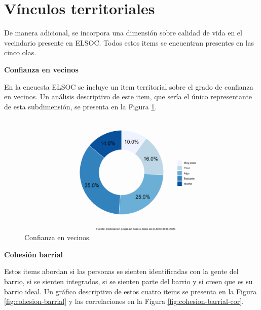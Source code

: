 \documentclass[
  12pt,
]{book}
\begin{document}
\hypertarget{vuxednculos-territoriales}{%
\section{Vínculos territoriales}\label{vuxednculos-territoriales}}

De manera adicional, se incorpora una dimensión sobre calidad de vida en el vecindario presente en ELSOC. Todos estos items se encuentran presentes en las cinco olas.

\textbf{Confianza en vecinos}

En la encuesta ELSOC se incluye un item territorial sobre el grado de confianza en vecinos. Un análisis descriptivo de este item, que sería el único representante de esta subdimensión, se presenta en la Figura \ref{fig:confianza-vecinos}.

\begin{figure}[H]

{\centering \includegraphics[width=1\linewidth,height=1\textheight]{output/graphs/confianza-vecinos} 

}

\caption{Confianza en vecinos.}\label{fig:confianza-vecinos}
\end{figure}

\textbf{Cohesión barrial}

Estos items abordan si las personas se sienten identificadas con la gente del barrio, si se sienten integrados, si se sienten parte del barrio y si creen que es su barrio ideal. Un gráfico descriptivo de estos cuatro items se presenta en la Figura \ref{fig:cohesion-barrial} y las correlaciones en la Figura \ref{fig:cohesion-barrial-cor}.
\end{document}
